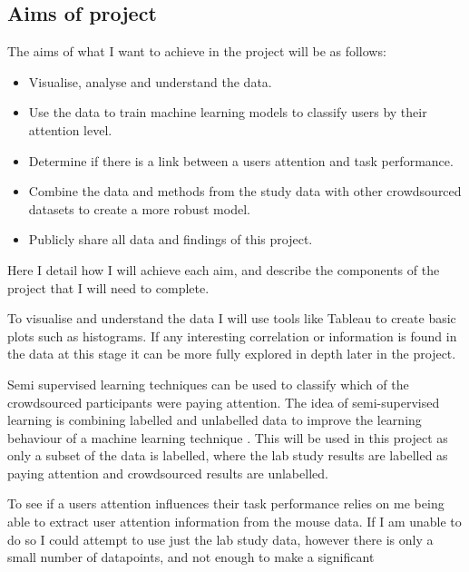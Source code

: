 \documentclass{article}
\begin{document}
\subsection{Aims of project}

The aims of what I want to achieve in the project will be as follows:
\begin{itemize}
    \item Visualise, analyse and understand the data.   %
    \item Use the data to train machine learning models to classify users by their attention level.
    \item Determine if there is a link between a users attention and task performance.
    \item Combine the data and methods from the study data with other crowdsourced datasets to create a more robust model.
    \item Publicly share all data and findings of this project.
\end{itemize}

Here I detail how I will achieve each aim, and describe the components of the project that I will need to complete.

To visualise and understand the data I will use tools like Tableau to create basic plots such as histograms.
If any interesting correlation or information is found in the data at this stage it can be more fully explored in depth later in the project.


Semi supervised learning techniques can be used to classify which of the crowdsourced participants were paying attention.
The idea of semi-supervised learning is combining labelled and unlabelled data to improve the learning behaviour of a machine learning technique \cite{zhu2009introduction}.
This will be used in this project as only a subset of the data is labelled, where the lab study results are labelled as paying attention and crowdsourced results are unlabelled.

To see if a users attention influences their task performance relies on me being able to extract user attention information from the mouse data.
If I am unable to do so I could attempt to use just the lab study data, however there is only a small number of datapoints, and not enough to make a significant
\end{document}

